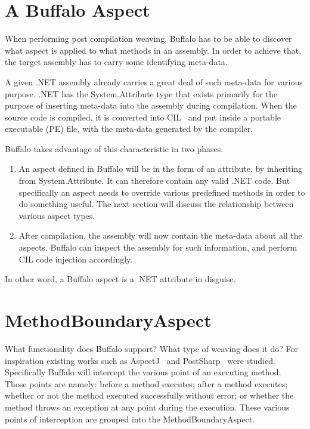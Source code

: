 \section{A Buffalo Aspect}

When performing post compilation weaving, Buffalo has to be able to discover what aspect is applied to what methods in an assembly. In order to achieve that, the target assembly has to carry some identifying meta-data.

A given .NET assembly already carries a great deal of such meta-data for various purpose. .NET has the System.Attribute type that exists primarily for the purpose of inserting meta-data into the assembly during compilation. When the source code is compiled, it is converted into CIL~\cite{msil_text} and put inside a portable executable (PE) file, with the meta-data generated by the compiler. 

Buffalo takes advantage of this characteristic in two phases.
\begin{enumerate}
	\item An aspect defined in Buffalo will be in the form of an attribute, by inheriting from System.Attribute. It can therefore contain any valid .NET code. But specifically an aspect needs to override various predefined methods in order to do something useful. The next section will discuss the relationship between various aspect types.
	\item After compilation, the assembly will now contain the meta-data about all the aspects. Buffalo can inspect the assembly for such information, and perform CIL code injection accordingly.
\end{enumerate}

In other word, a Buffalo aspect is a .NET attribute in disguise.

\section{MethodBoundaryAspect}
What functionality does Buffalo support? What type of weaving does it do? For inspiration existing works such as AspectJ~\cite{aspectj_faq} and PostSharp~\cite{postsharp} were studied. Specifically Buffalo will intercept the various point of an executing method. Those points are namely: before a method executes; after a method executes; whether or not the method executed successfully without error; or whether the method throws an exception at any point during the execution. These various points of interception are grouped into the MethodBoundaryAspect.

